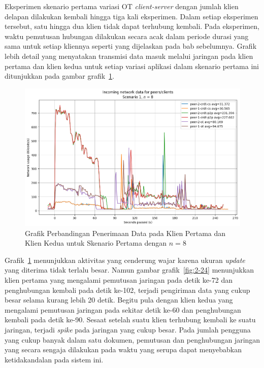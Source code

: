 Eksperimen skenario pertama variasi OT \textit{client-server} dengan jumlah klien delapan dilakukan kembali hingga tiga kali eksperimen. Dalam setiap eksperimen tersebut, satu hingga dua klien tidak dapat terhubung kembali. Pada eksperimen, waktu pemutusan hubungan dilakukan secara acak dalam periode durasi yang sama untuk setiap kliennya seperti yang dijelaskan pada bab sebelumnya. Grafik lebih detail yang menyatakan transmisi data masuk melalui jaringan pada klien pertama dan klien kedua untuk setiap variasi aplikasi dalam skenario pertama ini ditunjukkan pada gambar grafik~\ref{fig:2-23}.

\begin{figure}
 \centering
 \includegraphics[width=13cm]{./assets/skripsi/benchmark-vis_cell_2_output_23}
 \caption{Grafik Perbandingan Penerimaan Data pada Klien Pertama dan Klien Kedua untuk Skenario Pertama dengan $n = 8$}
 \label{fig:2-23}
\end{figure}

Grafik~\ref{fig:2-23} menunjukkan aktivitas yang cenderung wajar karena ukuran \textit{update} yang diterima tidak terlalu besar. Namun gambar grafik~\ref{fig:2-24} menunjukkan klien pertama yang mengalami pemutusan jaringan pada detik ke-72 dan penghubungan kembali pada detik ke-102, terjadi pengiriman data yang cukup besar selama kurang lebih 20 detik. Begitu pula dengan klien kedua yang mengalami pemutusan jaringan pada sekitar detik ke-60 dan penghubungan kembali pada detik ke-90. Sesaat setelah suatu klien terhubung kembali ke suatu jaringan, terjadi \textit{spike} pada jaringan yang cukup besar. Pada jumlah pengguna yang cukup banyak dalam satu dokumen, pemutusan dan penghubungan jaringan yang secara sengaja dilakukan pada waktu yang serupa dapat menyebabkan ketidakandalan pada sistem ini.

